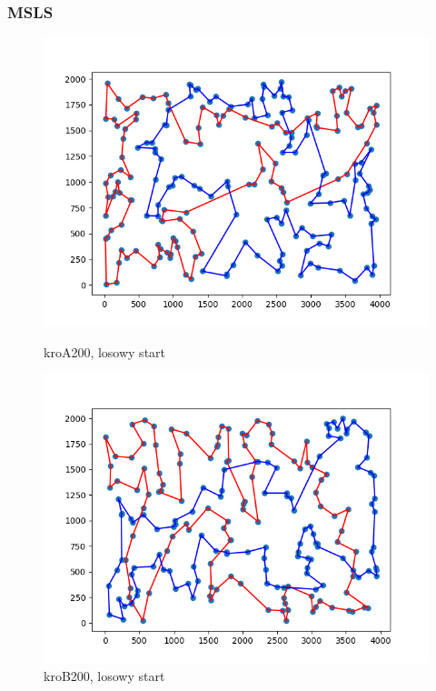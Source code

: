 \documentclass[11pt]{article}
\begin{document}
\subsubsection{MSLS}

\begin{figure}[H]
    \begin{minipage}[t]{0.45\textwidth}
        \centering
        \includegraphics[width=\linewidth]{best_paths/kroA200/MSLS}
        \caption{kroA200, losowy start}
    \end{minipage}
    \hfill
    \begin{minipage}[t]{0.45\textwidth}
        \centering
        \includegraphics[width=\linewidth]{best_paths/kroB200/MSLS}
        \caption{kroB200, losowy start}
    \end{minipage}\label{fig:figure3}
\end{figure}
\end{document}
